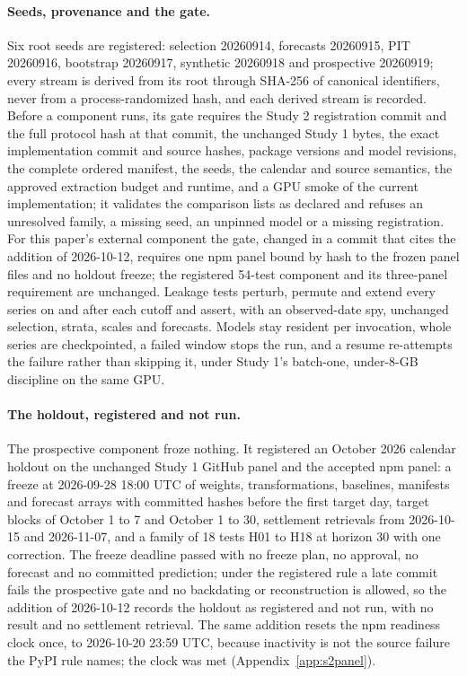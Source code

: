 \paragraph{Seeds, provenance and the gate.} Six root seeds are registered: selection 20260914, forecasts
20260915, PIT 20260916, bootstrap 20260917, synthetic 20260918 and prospective 20260919; every stream is
derived from its root through SHA-256 of canonical identifiers, never from a process-randomized hash, and
each derived stream is recorded. Before a component runs, its gate requires the Study 2 registration commit
and the full protocol hash at that commit, the unchanged Study 1 bytes, the exact implementation commit and
source hashes, package versions and model revisions, the complete ordered manifest, the seeds, the calendar
and source semantics, the approved extraction budget and runtime, and a GPU smoke of the current
implementation; it validates the comparison lists as declared and refuses an unresolved family, a missing
seed, an unpinned model or a missing registration. For this paper's external component the gate, changed in
a commit that cites the addition of 2026-10-12, requires one npm panel bound by hash to the frozen panel
files and no holdout freeze; the registered 54-test component and its three-panel requirement are unchanged.
Leakage tests perturb, permute and extend every series on and after each cutoff and assert, with an
observed-date spy, unchanged selection, strata, scales and forecasts. Models stay resident per invocation,
whole series are checkpointed, a failed window stops the run, and a resume re-attempts the failure rather
than skipping it, under Study 1's batch-one, under-8-GB discipline on the same GPU.

\paragraph{The holdout, registered and not run.} The prospective component froze nothing. It registered an
October 2026 calendar holdout on the unchanged Study 1 GitHub panel and the accepted npm panel: a freeze at
2026-09-28 18:00 UTC of weights, transformations, baselines, manifests and forecast arrays with committed
hashes before the first target day, target blocks of October 1 to 7 and October 1 to 30, settlement
retrievals from 2026-10-15 and 2026-11-07, and a family of 18 tests H01 to H18 at horizon 30 with one
correction. The freeze deadline passed with no freeze plan, no approval, no forecast and no committed
prediction; under the registered rule a late commit fails the prospective gate and no backdating or
reconstruction is allowed, so the addition of 2026-10-12 records the holdout as registered and not run, with
no result and no settlement retrieval. The same addition resets the npm readiness clock once, to 2026-10-20
23:59 UTC, because inactivity is not the source failure the PyPI rule names; the clock was met
(Appendix~\ref{app:s2panel}).

